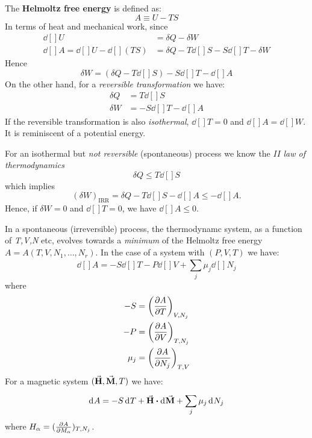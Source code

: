 \documentclass[../main/main.tex]{subfiles}
\begin{document}
The \textbf{Helmoltz free energy} is defined as:
\begin{equation}
  A \equiv U-T S
  \label{eq:}
\end{equation}
In terms of heat and mechanical work, since
\begin{subequations}
\begin{align}
  \dd[]{U} &= \delta Q - \delta W \\
  \dd[]{A} = \dd[]{U} - \dd[]{(TS)} &= \delta Q - T \dd[]{S} - S \dd[]{T} - \delta W
\end{align}
\label{}
\end{subequations}
Hence
\begin{equation}
  \delta W = (\delta Q - T \dd[]{S} ) - S \dd[]{T} - \dd[]{A}
  \label{eq:}
\end{equation}
On the other hand, for a \emph{reversible transformation} we have:
\begin{subequations}
\begin{align}
  \delta Q &=  T \dd[]{S} \\
  \delta W &= - S \dd[]{T} - \dd[]{A}
\end{align}
\label{}
\end{subequations}
If the reversible transformation is also \emph{isothermal}, \( \dd[]{T} = 0  \) and \( \dd[]{A} = \dd[]{W}  \). It is reminiscent of a potential energy.
\begin{observation}
For an isothermal but \emph{not reversible} (spontaneous) process we know the \(II\) \emph{law of thermodynamics}
\begin{equation*}
  \delta Q \le T \dd[]{S}
\end{equation*}
which implies
\begin{equation*}
  (\delta W)_{\text{IRR}} = \delta Q - T \dd[]{S} - \dd[]{A} \le - \dd[]{A}.
\end{equation*}
Hence, if \( \delta W = 0 \) and \( \dd[]{T}=0  \), we have \( \dd[]{A} \le 0  \).
\end{observation}
In a spontaneous (irreversible) process, the thermodynamc system, as a function of \emph{T,V,N} etc, evolves towards a \emph{minimum} of the Helmoltz free energy \( A=A(T,V,N_1,\dots,N_r) \).
In the case of a system with \( (P,V,T) \)  we have:
\begin{equation}
  \dd[]{A} = -S \dd[]{T} - P \dd[]{V} + \sum_{j}^{} \mu _j \dd[]{N_j}
  \label{eq:}
\end{equation}
where
\begin{subequations}
\begin{align}
  -S &= \qty(\pdv{A}{T} )_{V,N_j}  \\
  -P &= \qty(\pdv{A}{V} )_{T,N_j}  \\
  \mu _j &= \qty(\pdv{A}{N_j} )_{T,V}
\end{align}
\label{}
\end{subequations}
For a magnetic system \( (\va{H} , \va{M} , T) \) we have:
\begin{equation}
  \dd[]{A} = - S \dd[]{T} + \va{H} \vdot \dd[]{\va{M} } + \sum_{j}^{} \mu _j \dd[]{N_j}
  \label{eq:}
\end{equation}
where \( H_\alpha = (\pdv{A}{M_\alpha} )_{T,{N_j}} \).
\end{document}
